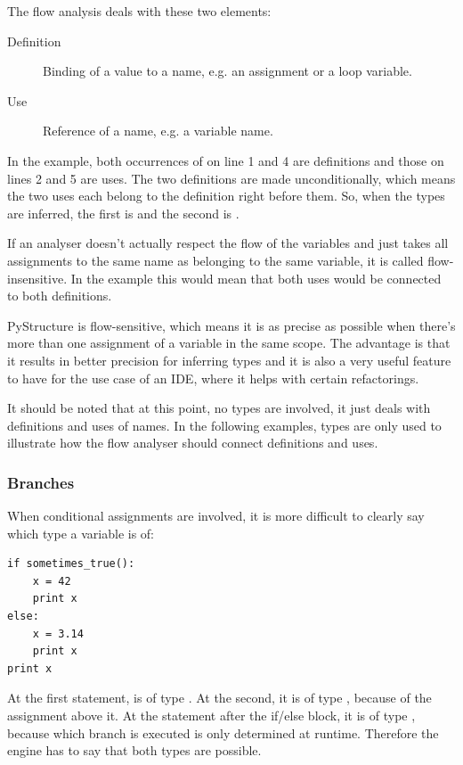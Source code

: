 \documentclass[12pt,halfparskip]{scrreprt}
\begin{document}
The flow analysis deals with these two elements:

\begin{description}
	\item[Definition] Binding of a value to a name, e.g. an assignment or a  loop variable.
	\item[Use] Reference of a name, e.g. a variable name.
\end{description}

In the example, both occurrences of  on line 1 and 4 are definitions and those on lines 2 and 5 are uses. The two definitions are made unconditionally, which means the two uses each belong to the definition right before them. So, when the types are inferred, the first  is  and the second is .

If an analyser doesn't actually respect the flow of the variables and just takes all assignments to the same name as belonging to the same variable, it is called flow-insensitive. In the example this would mean that both uses would be connected to both definitions.


PyStructure is flow-sensitive, which means it is as precise as possible when there's more than one assignment of a variable in the same scope. The advantage is that it results in better precision for inferring types and it is also a very useful feature to have for the use case of an IDE, where it helps with certain refactorings.

It should be noted that at this point, no types are involved, it just deals with definitions and uses of names. In the following examples, types are only used to illustrate how the flow analyser should connect definitions and uses.

\subsubsection{Branches}

When conditional assignments are involved, it is more difficult to clearly say which type a variable is of:

\begin{lstlisting}
if sometimes_true():
    x = 42
    print x
else:
    x = 3.14
    print x
print x
\end{lstlisting}

At the first  statement,  is of type . At the second, it is of type , because of the assignment above it. At the  statement after the if/else block, it is of type , because which branch is executed is only determined at runtime. Therefore the engine has to say that both types are possible. 
\end{document}
